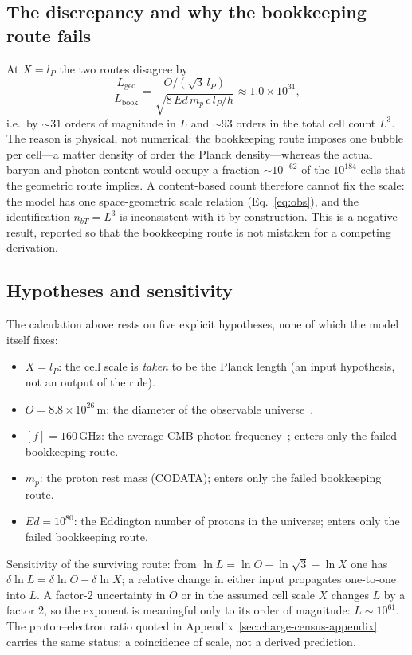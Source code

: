 \documentclass{ijuc}
\begin{document}
\subsection{The discrepancy and why the bookkeeping route fails}
At $X=l_{P}$ the two routes disagree by
\[
\frac{L_{\mathrm{geo}}}{L_{\mathrm{book}}}
=\frac{O/(\sqrt{3}\,l_{P})}{\sqrt{8\,Ed\,m_{p}\,c\,l_{P}/h}}
\approx 1.0\times10^{31},
\]
i.e.\ by $\sim31$ orders of magnitude in $L$ and $\sim93$ orders in the total cell count $L^{3}$.  The reason is physical, not numerical: the bookkeeping route imposes one bubble per cell---a matter density of order the Planck density---whereas the actual baryon and photon content would occupy a fraction $\sim10^{-62}$ of the $10^{184}$ cells that the geometric route implies.  A content-based count therefore cannot fix the scale: the model has one space-geometric scale relation (Eq.~\eqref{eq:obs}), and the identification $n_{bT}=L^{3}$ is inconsistent with it by construction.  This is a negative result, reported so that the bookkeeping route is not mistaken for a competing derivation.

\subsection{Hypotheses and sensitivity}\label{subsec:appendixA-sensitivity}
The calculation above rests on five explicit hypotheses, none of which the model itself fixes:
\begin{itemize}
\item[H1] $X=l_{P}$: the cell scale is \emph{taken} to be the Planck length (an input hypothesis, not an output of the rule).
\item[H2] $O=8.8\times10^{26}$\,m: the diameter of the observable universe~\cite{halpbern}.
\item[H3] $[f]=160$\,GHz: the average CMB photon frequency~\cite{archeops}; enters only the failed bookkeeping route.
\item[H4] $m_{p}$: the proton rest mass (CODATA); enters only the failed bookkeeping route.
\item[H5] $Ed=10^{80}$: the Eddington number of protons in the universe; enters only the failed bookkeeping route.
\end{itemize}
Sensitivity of the surviving route: from $\ln L=\ln O-\ln\sqrt{3}-\ln X$ one has $\delta\ln L=\delta\ln O-\delta\ln X$; a relative change in either input propagates one-to-one into $L$.  A factor-2 uncertainty in $O$ or in the assumed cell scale $X$ changes $L$ by a factor 2, so the exponent is meaningful only to its order of magnitude: $L\sim10^{61}$.  The proton--electron ratio quoted in Appendix~\ref{sec:charge-census-appendix} carries the same status: a coincidence of scale, not a derived prediction.
\end{document}
